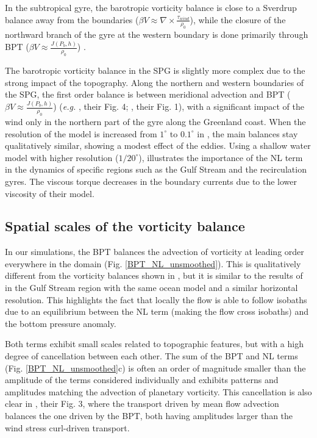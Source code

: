 \documentclass{ametsoc}
\begin{document}
In the subtropical gyre, the barotropic vorticity balance is close to a Sverdrup balance away from the boundaries ($\beta V \approx \nabla \times \frac{\tau _{wind}}{\rho_{0}}$), while the closure of the northward branch of the gyre at the western boundary is done primarily through BPT ($\beta V \approx \frac{J(P_b,h)}{\rho _0}$)  \citep{schoonover2016}.

The barotropic vorticity balance in the SPG is slightly more complex due to the strong impact of the topography. Along the northern and western boundaries of the SPG, the first order balance is between meridional advection and BPT ($\beta V \approx \frac{J(P_b,h)}{\rho _0}$) (\textit{e.g.} \citet{hughes2001}, their Fig. 4; \citet{yeager2015}, their Fig. 1), with a significant impact of the wind only in the northern part of the gyre along the Greenland coast. When the resolution of the model is increased from $1^{\circ}$ to $0.1^{\circ}$ in \citet{yeager2015}, the main balances stay qualitatively similar, showing a modest effect of the eddies. Using a shallow water model with higher resolution ($1/20^{\circ}$), \cite{wang2017} illustrates the importance of the NL term in the dynamics of specific regions such as the Gulf Stream and the recirculation gyres. The viscous torque decreases in the boundary currents due to the lower viscosity of their model.

\subsection{Spatial scales of the vorticity balance}

In our simulations, the BPT balances the advection of vorticity at leading order everywhere in the domain  (Fig. \ref{BPT_NL_unsmoothed}). This is qualitatively different from the vorticity balances shown in \citet{yeager2015}, but it is similar to the results of \citet{gula2015} in the Gulf Stream region with the same ocean model and a similar horizontal resolution. This highlights the fact that locally the flow is able to follow isobaths due to an equilibrium between the NL term (making the flow cross isobaths) and the bottom pressure anomaly.

Both terms exhibit small scales related to topographic features, but with a high degree of cancellation between each other. The sum of the BPT and NL terms (Fig. \ref{BPT_NL_unsmoothed}c) is often an order of magnitude smaller than the amplitude of the terms considered individually and exhibits patterns and amplitudes matching the advection of planetary vorticity. This cancellation is also clear in \cite{wang2017}, their Fig. 3, where the transport driven by mean flow advection balances the one driven by the BPT, both having amplitudes larger than the wind stress curl-driven transport.
\end{document}
